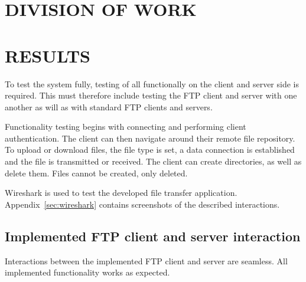 \documentclass[10pt,twocolumn]{witseiepaper}
\begin{document}


\section{DIVISION OF WORK}

\section{RESULTS}\label{results}

To test the system fully, testing of all functionally on the client and server side is required. This must therefore include testing the FTP client and server with one another as will as with standard FTP clients and servers.

Functionality testing begins with connecting and performing client authentication. The client can then navigate around their remote file repository. To upload or download files, the file type is set, a data connection is established and the file is transmitted or received. The client can create directories, as well as delete them. Files cannot be created, only deleted.

Wireshark is used to test the developed file transfer application. Appendix~\ref{sec:wireshark} contains screenshots of the described interactions. 

\subsection{Implemented FTP client and server interaction}

Interactions between the implemented FTP client and server are seamless. All implemented functionality works as expected.
\end{document}
